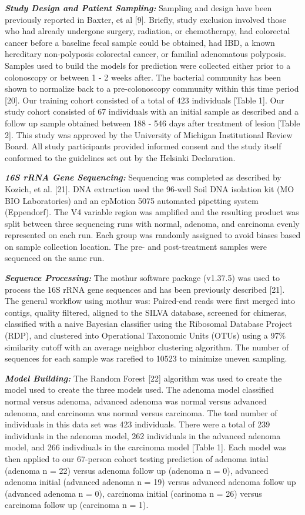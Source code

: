 \documentclass[12pt,]{article}
\begin{document}
\textbf{\emph{Study Design and Patient Sampling:}} Sampling and design
have been previously reported in Baxter, et al {[}9{]}. Briefly, study
exclusion involved those who had already undergone surgery, radiation,
or chemotherapy, had colorectal cancer before a baseline fecal sample
could be obtained, had IBD, a known hereditary non-polyposis colorectal
cancer, or familial adenomatous polyposis. Samples used to build the
models for prediction were collected either prior to a colonoscopy or
between 1 - 2 weeks after. The bacterial community has been shown to
normalize back to a pre-colonoscopy community within this time period
{[}20{]}. Our training cohort consisted of a total of 423 individuals
{[}Table 1{]}. Our study cohort consisted of 67 individuals with an
initial sample as described and a follow up sample obtained between 188
- 546 days after treatment of lesion {[}Table 2{]}. This study was
approved by the University of Michigan Institutional Review Board. All
study participants provided informed consent and the study itself
conformed to the guidelines set out by the Helsinki Declaration.

\textbf{\emph{16S rRNA Gene Sequencing:}} Sequencing was completed as
described by Kozich, et al. {[}21{]}. DNA extraction used the 96-well
Soil DNA isolation kit (MO BIO Laboratories) and an epMotion 5075
automated pipetting system (Eppendorf). The V4 variable region was
amplified and the resulting product was split between three sequencing
runs with normal, adenoma, and carcinoma evenly represented on each run.
Each group was randomly assigned to avoid biases based on sample
collection location. The pre- and post-treatment samples were sequenced
on the same run.

\textbf{\emph{Sequence Processing:}} The mothur software package
(v1.37.5) was used to process the 16S rRNA gene sequences and has been
previously described {[}21{]}. The general workflow using mothur was:
Paired-end reads were first merged into contigs, quality filtered,
aligned to the SILVA database, screened for chimeras, classified with a
naive Bayesian classifier using the Ribosomal Database Project (RDP),
and clustered into Operational Taxonomic Units (OTUs) using a 97\%
similarity cutoff with an average neighbor clustering algorithm. The
number of sequences for each sample was rarefied to 10523 to minimize
uneven sampling.

\textbf{\emph{Model Building:}} The Random Forest {[}22{]} algorithm was
used to create the model used to create the three models used. The
adenoma model classified normal versus adenoma, advanced adenoma was
normal versus advanced adenoma, and carcinoma was normal versus
carcinoma. The toal number of individuals in this data set was 423
individuals. There were a total of 239 individuals in the adenoma model,
262 individuals in the advanced adenoma model, and 266 indivdiuals in
the carcinoma model {[}Table 1{]}. Each model was then applied to our
67-person cohort testing prediction of adenoma intial (adenoma n = 22)
versus adenoma follow up (adenoma n = 0), advanced adenoma initial
(advanced adenoma n = 19) versus advanced adenoma follow up (advanced
adenoma n = 0), carcinoma initial (carinoma n = 26) versus carcinoma
follow up (carcinoma n = 1).
\end{document}
